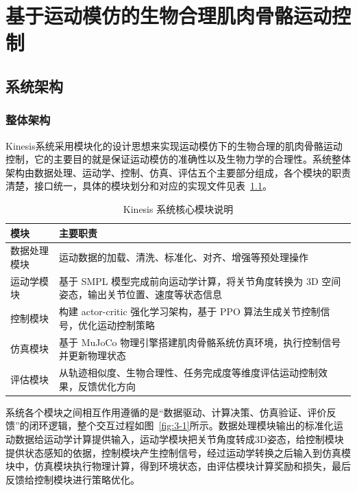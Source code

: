 
\chapter{基于运动模仿的生物合理肌肉骨骼运动控制}

\section{系统架构}\label{ux7cfbux7edfux67b6ux6784}

\subsection{整体架构}\label{ux6574ux4f53ux67b6ux6784}

Kinesis系统采用模块化的设计思想来实现运动模仿下的生物合理的肌肉骨骼运动控制，它的主要目的就是保证运动模仿的准确性以及生物力学的合理性。系统整体架构由数据处理、运动学、控制、仿真、评估五个主要部分组成，各个模块的职责清楚，接口统一，具体的模块划分和对应的实现文件见表~\ref{tab:3-1}。

\begin{table}[htbp]
\centering
\caption{Kinesis 系统核心模块说明}
\label{tab:3-1}
\small
\begin{tabularx}{\textwidth}{lX}
\toprule
模块 & 主要职责 \\
\midrule
数据处理模块 & 运动数据的加载、清洗、标准化、对齐、增强等预处理操作 \\
运动学模块 & 基于 SMPL 模型完成前向运动学计算，将关节角度转换为 3D 空间姿态，输出关节位置、速度等状态信息 \\
控制模块 & 构建 actor-critic 强化学习架构，基于 PPO 算法生成关节控制信号，优化运动控制策略 \\
仿真模块 & 基于 MuJoCo 物理引擎搭建肌肉骨骼系统仿真环境，执行控制信号并更新物理状态 \\
评估模块 & 从轨迹相似度、生物合理性、任务完成度等维度评估运动控制效果，反馈优化方向 \\
\bottomrule
\end{tabularx}
\end{table}

系统各个模块之间相互作用遵循的是“数据驱动、计算决策、仿真验证、评价反馈”的闭环逻辑，整个交互过程如图~\ref{fig:3-1}所示。数据处理模块输出的标准化运动数据给运动学计算提供输入，运动学模块把关节角度转成3D姿态，给控制模块提供状态感知的依据，控制模块产生控制信号，经过运动学转换之后输入到仿真模块中，仿真模块执行物理计算，得到环境状态，由评估模块计算奖励和损失，最后反馈给控制模块进行策略优化。

